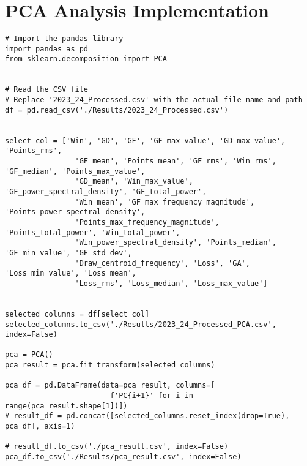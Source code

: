 \section{PCA Analysis Implementation}\label{sec:PCA}
% 
\begin{lstlisting}[style=pystyle]
# Import the pandas library
import pandas as pd
from sklearn.decomposition import PCA


# Read the CSV file
# Replace '2023_24_Processed.csv' with the actual file name and path
df = pd.read_csv('./Results/2023_24_Processed.csv')


select_col = ['Win', 'GD', 'GF', 'GF_max_value', 'GD_max_value', 'Points_rms',
                'GF_mean', 'Points_mean', 'GF_rms', 'Win_rms', 'GF_median', 'Points_max_value',
                'GD_mean', 'Win_max_value', 'GF_power_spectral_density', 'GF_total_power',
                'Win_mean', 'GF_max_frequency_magnitude', 'Points_power_spectral_density',
                'Points_max_frequency_magnitude', 'Points_total_power', 'Win_total_power',
                'Win_power_spectral_density', 'Points_median', 'GF_min_value', 'GF_std_dev',
                'Draw_centroid_frequency', 'Loss', 'GA', 'Loss_min_value', 'Loss_mean',
                'Loss_rms', 'Loss_median', 'Loss_max_value']


selected_columns = df[select_col]
selected_columns.to_csv('./Results/2023_24_Processed_PCA.csv', index=False)

pca = PCA()
pca_result = pca.fit_transform(selected_columns)

pca_df = pd.DataFrame(data=pca_result, columns=[
                        f'PC{i+1}' for i in range(pca_result.shape[1])])
# result_df = pd.concat([selected_columns.reset_index(drop=True), pca_df], axis=1)

# result_df.to_csv('./pca_result.csv', index=False)
pca_df.to_csv('./Results/pca_result.csv', index=False)

\end{lstlisting}